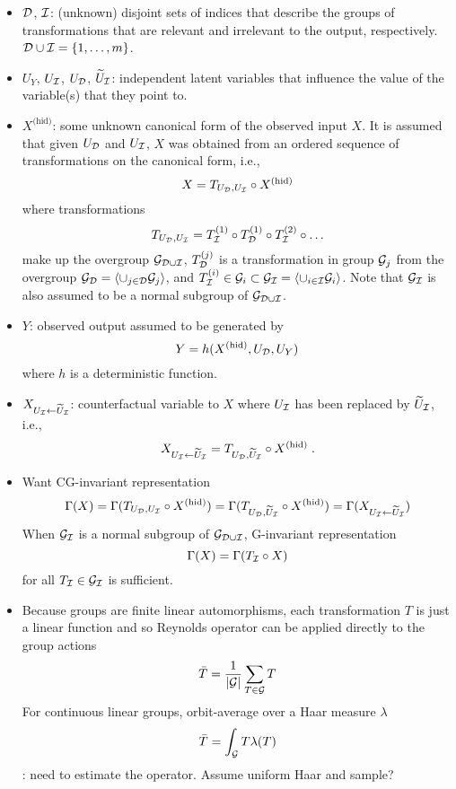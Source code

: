 \documentclass[10pt]{article}
\begin{document}
\begin{itemize}

\item
$\mathcal{D}$, $\mathcal{I}$: (unknown) disjoint sets of indices that describe the groups of transformations that are relevant and irrelevant to the output, respectively. $\mathcal{D}\cup\mathcal{I}=\{1,\ldots,m\}$.

\item
$U_Y$, $U_{\mathcal{I}}$, $U_{\mathcal{D}}$, $\widetilde{U}_{\mathcal{I}}$: independent latent variables that influence the value of the variable(s) that they point to.

\item
$X^{\text{(hid)}}$: some unknown canonical form of the observed input $X$.  It is assumed that given $U_{\mathcal{D}}$ and $U_{\mathcal{I}}$, $X$ was obtained from an ordered sequence of transformations on the canonical form, i.e.,
\[
X=T_{U_{\mathcal{D}},U_{\mathcal{I}}}\circ X^{\text{(hid)}}
\]
where transformations
\[
T_{U_{\mathcal{D}},U_{\mathcal{I}}}=T_{\mathcal{I}}^{(1)}\circ T_{\mathcal{D}}^{(1)}\circ T_{\mathcal{I}}^{(2)}\circ\ldots
\]
make up the overgroup $\mathcal{G}_{\mathcal{D}\cup\mathcal{I}}$, $T_{\mathcal{D}}^{(j)}$ is a transformation in group $\mathcal{G}_j$ from the overgroup $\mathcal{G}_{\mathcal{D}}=\langle\cup_{j\in\mathcal{D}}\mathcal{G}_j\rangle$, and $T_{\mathcal{I}}^{(i)}\in\mathcal{G}_i\subset\mathcal{G}_{\mathcal{I}}=\langle\cup_{i\in\mathcal{I}}\mathcal{G}_i\rangle$. Note that $\mathcal{G}_{\mathcal{I}}$ is also assumed to be a normal subgroup of $\mathcal{G}_{\mathcal{D}\cup\mathcal{I}}$.

\item
$Y$: observed output assumed to be generated by
\[
Y = h(X^{\text{(hid)}},U_{\mathcal{D}},U_Y)
\]
where $h$ is a deterministic function.

\item
$X_{U_{\mathcal{I}}\leftarrow\widetilde{U}_{\mathcal{I}}}$: counterfactual variable to $X$ where $U_{\mathcal{I}}$ has been replaced by $\widetilde{U}_{\mathcal{I}}$, i.e.,
\[
X_{U_{\mathcal{I}}\leftarrow\widetilde{U}_{\mathcal{I}}} = T_{U_{\mathcal{D}},\widetilde{U}_{\mathcal{I}}}\circ X^{\text{(hid)}} \;.
\]

\item
Want CG-invariant representation
\[
\Gamma(X) = \Gamma(T_{U_{\mathcal{D}},U_{\mathcal{I}}}\circ X^{\text{(hid)}}) = \Gamma(T_{U_{\mathcal{D}},\widetilde{U}_{\mathcal{I}}}\circ X^{\text{(hid)}}) =  \Gamma(X_{U_{\mathcal{I}}\leftarrow\widetilde{U}_{\mathcal{I}}})
\]
When $\mathcal{G}_{\mathcal{I}}$ is a normal subgroup of $\mathcal{G}_{\mathcal{D}\cup\mathcal{I}}$, G-invariant representation
\[
\Gamma(X) = \Gamma(T_{\mathcal{I}}\circ X)
\]
for all $T_{\mathcal{I}}\in\mathcal{G}_{\mathcal{I}}$ is sufficient.

\item
Because groups are finite linear automorphisms, each transformation $T$ is just a linear function and so Reynolds operator can be applied directly to the group actions
\[
\bar{T} = \frac{1}{|\mathcal{G}|}\sum_{T\in\mathcal{G}}T
\]
For continuous linear groups, orbit-average over a Haar measure $\lambda$
\[
\bar{T} = \int_{\mathcal{G}} T\lambda(T)
\]
\todo: need to estimate the operator. Assume uniform Haar and sample?

\end{itemize}
\end{document}
